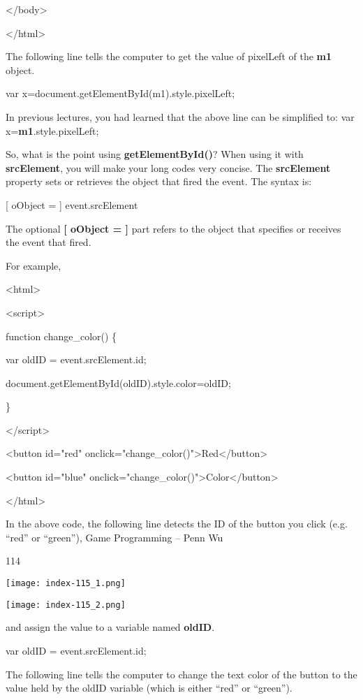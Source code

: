 \documentclass[
]{article}
\begin{document}
\textless/body\textgreater{}

\textless/html\textgreater{}

The following line tells the computer to get the value of pixelLeft of
the \textbf{m1} object.

var
x=document.getElementById(\textquotesingle m1\textquotesingle).style.pixelLeft;

In previous lectures, you had learned that the above line can be
simplified to: var x=\textbf{m1}.style.pixelLeft;

So, what is the point using \textbf{getElementById()}? When using it
with \textbf{srcElement}, you will make your long codes very concise.
The \textbf{srcElement} property sets or retrieves the object that fired
the event. The syntax is:

{[} oObject = {]} event.srcElement

The optional \textbf{{[} oObject = {]}} part refers to the object that
specifies or receives the event that fired.

For example,

\textless html\textgreater{}

\textless script\textgreater{}

function change\_color() \{

var oldID = event.srcElement.id;

document.getElementById(oldID).style.color=oldID;

\}

\textless/script\textgreater{}

\textless button id="red"
onclick="change\_color()"\textgreater Red\textless/button\textgreater{}

\textless button id="blue"
onclick="change\_color()"\textgreater Color\textless/button\textgreater{}

\textless/html\textgreater{}

In the above code, the following line detects the ID of the button you
click (e.g. ``red'' or ``green''), Game Programming -- Penn Wu

114

\protect\hypertarget{index_split_008.htmlux5cux23p115}{}{}\texttt{[image: index-115\_1.png]}

\texttt{[image: index-115\_2.png]}

and assign the value to a variable named \textbf{oldID}.

var oldID = event.srcElement.id;

The following line tells the computer to change the text color of the
button to the value held by the oldID variable (which is either ``red''
or ``green'').
\end{document}
